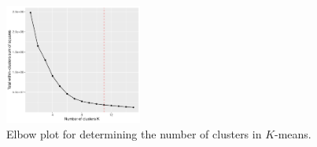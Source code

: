 \documentclass{article}
\theoremstyle{plain}
\theoremstyle{definition}
\begin{document}
\begin{figure}[ht]
\begin{center}
\includegraphics[width=0.4\textwidth]{elbowm.pdf}
\end{center}
\caption{Elbow plot for determining the number of clusters in $K$-means.}\label{figure:elbow}
\end{figure}



\end{document}

